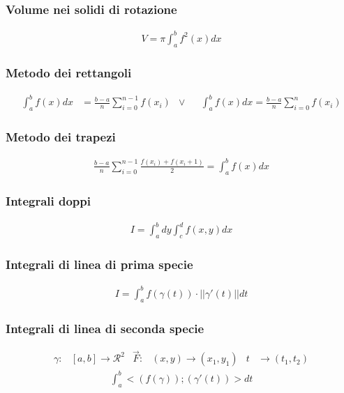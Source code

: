 \documentclass[a4paper]{article}
\begin{document}
	\subsubsection{Volume nei solidi di rotazione}
	\begin{align*}
		V =\pi \int_{a}^{b} f^2(x)dx
	\end{align*}
	
	\subsubsection{Metodo dei rettangoli}
	\begin{align*}
		\int_{a}^{b}f(x)dx &= \frac{b-a}{n}\sum_{i=0}^{n-1}f(x_i)		&\vee&	&	\int_{a}^{b} f(x)dx =\frac{b-a}{n}\sum_{i=0}^{n} f(x_i)		
	\end{align*}
	
	\subsubsection{Metodo dei trapezi}
	\begin{align*}
		\frac{b-a}{n}\sum_{i=0}^{n-1}\frac{f(x_i)+f(x_i + 1)}{2} = \int_{a}^{b} f(x)dx
	\end{align*}
	
	
	\newpage
	\subsubsection{Integrali doppi}
	\begin{align*}
		I = \int_{a}^{b}dy\int_{c}^{d}f(x,y)dx
	\end{align*}
	\subsubsection{Integrali di linea di prima specie}
	\begin{align*}
		I = \int_{a}^{b}f(\gamma (t)) \cdot ||\gamma'(t)||dt
	\end{align*}
	
	\subsubsection{Integrali di linea di seconda specie}
		\begin{align*}
		\gamma:&[a,b] \to \mathcal{R}^2	&	\vec{F}:&(x,y)\to(x_1,y_1)	&	t &\to (t_1,t_2)
		\end{align*}
		\begin{align*}
			\int_{a}^{b}<(f(\gamma));(\gamma'(t))> dt
		\end{align*}
\end{document}
